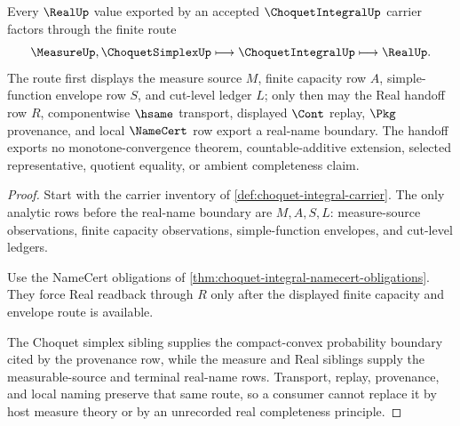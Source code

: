 \begin{theorem}
\label{thm:choquet-integral-capacity-handoff}
Every $\RealUp$ value exported by an accepted $\ChoquetIntegralUp$ carrier factors through the finite route
$$
\MeasureUp,\ChoquetSimplexUp \longmapsto \ChoquetIntegralUp \longmapsto \RealUp .
$$
The route first displays the measure source $M$, finite capacity row $A$, simple-function envelope row $S$, and cut-level ledger $L$; only then may the Real handoff row $R$, componentwise $\hsame$ transport, displayed $\Cont$ replay, $\Pkg$ provenance, and local $\NameCert$ row export a real-name boundary. The handoff exports no monotone-convergence theorem, countable-additive extension, selected representative, quotient equality, or ambient completeness claim.
\end{theorem}
\begin{proof}
Start with the carrier inventory of \autoref{def:choquet-integral-carrier}. The only analytic rows before the real-name boundary are $M,A,S,L$: measure-source observations, finite capacity observations, simple-function envelopes, and cut-level ledgers.

Use the NameCert obligations of \autoref{thm:choquet-integral-namecert-obligations}. They force Real readback through $R$ only after the displayed finite capacity and envelope route is available.

The Choquet simplex sibling supplies the compact-convex probability boundary cited by the provenance row, while the measure and Real siblings supply the measurable-source and terminal real-name rows. Transport, replay, provenance, and local naming preserve that same route, so a consumer cannot replace it by host measure theory or by an unrecorded real completeness principle.
\end{proof}



